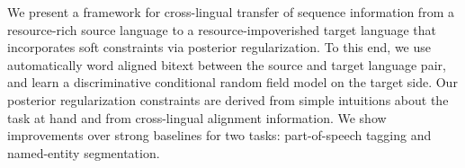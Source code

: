 \documentclass[twoside,makeidx]{book}
\begin{document}
\nopagebreak%
\noindent%
{\small We present a framework for cross-lingual transfer of sequence information from a resource-rich source language to a resource-impoverished target language that incorporates soft constraints via posterior regularization. To this end, we use automatically word aligned bitext between the source and target language pair, and learn a discriminative conditional random field model on the target side. Our posterior regularization constraints are derived from simple intuitions about the task at hand and from cross-lingual alignment information. We show improvements over strong baselines for two tasks: part-of-speech tagging and named-entity segmentation.}
\clearpage
\end{document}
